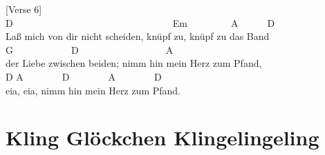 \documentclass[
  letterpaper,
  a5paper]{memoir}
\begin{document}
{[}Verse 6{]}\\
\hspace*{0.333em}\hspace*{0.333em}\hspace*{0.333em}\hspace*{0.333em}\hspace*{0.333em}D~~~~~~~~~~~~~~~~~~~~~~~~~~~~~~~~~Em~~~~~~~~~A~~~~~~D\\
Laß mich von dir nicht scheiden, knüpf zu, knüpf zu das Band\\
\hspace*{0.333em}\hspace*{0.333em}\hspace*{0.333em}\hspace*{0.333em}\hspace*{0.333em}\hspace*{0.333em}\hspace*{0.333em}\hspace*{0.333em}\hspace*{0.333em}\hspace*{0.333em}\hspace*{0.333em}\hspace*{0.333em}\hspace*{0.333em}\hspace*{0.333em}\hspace*{0.333em}\hspace*{0.333em}\hspace*{0.333em}\hspace*{0.333em}\hspace*{0.333em}\hspace*{0.333em}G~~~~~~~~~~~~D~~~~~~~~~~~~~~~~~~A\\
der Liebe zwischen beiden; nimm hin mein Herz zum Pfand,\\
\hspace*{0.333em}\hspace*{0.333em}\hspace*{0.333em}\hspace*{0.333em}\hspace*{0.333em}D
A~~~~~~~~D~~~~~~~~A~~~~~~~~D\\
eia, eia, nimm hin mein Herz zum Pfand.

\hypertarget{kling-gluxf6ckchen-klingelingeling}{%
\chapter{Kling Glöckchen
Klingelingeling}\label{kling-gluxf6ckchen-klingelingeling}}
\end{document}
